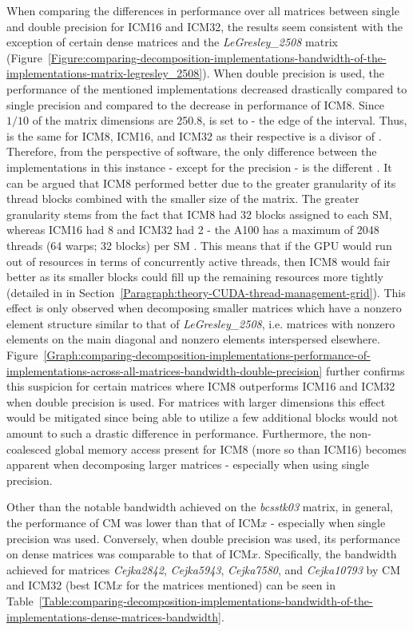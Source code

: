 When comparing the differences in performance over all matrices between single and double precision for ICM16 and ICM32, the results seem consistent with the exception of certain dense matrices and the \textit{LeGresley\_2508} matrix (Figure~\ref{Figure:comparing-decomposition-implementations-bandwidth-of-the-implementations-matrix-legresley_2508}). When double precision is used, the performance of the mentioned implementations decreased drastically compared to single precision and compared to the decrease in performance of ICM8. Since $ 1/10 $ of the matrix dimensions are 250.8,  is set to  - the edge of the interval. Thus,  is the same for ICM8, ICM16, and ICM32 as their respective  is a divisor of . Therefore, from the perspective of software, the only difference between the implementations in this instance - except for the precision - is the different . It can be argued that ICM8 performed better due to the greater granularity of its thread blocks combined with the smaller size of the matrix. The greater granularity stems from the fact that ICM8 had 32 blocks assigned to each SM, whereas ICM16 had 8 and ICM32 had  2 - the A100 has a maximum of 2048 threads (64 warps; 32 blocks) per SM \cite{soj8qSRbfefUdi8Y}. This means that if the GPU would run out of resources in terms of concurrently active threads, then ICM8 would fair better as its smaller blocks could fill up the remaining resources more tightly (detailed in \textit{} in Section~\ref{Paragraph:theory-CUDA-thread-management-grid}). This effect is only observed when decomposing smaller matrices which have a nonzero element structure similar to that of \textit{LeGresley\_2508}, i.e. matrices with nonzero elements on the main diagonal and nonzero elements interspersed elsewhere. Figure~\ref{Graph:comparing-decomposition-implementations-performance-of-implementations-across-all-matrices-bandwidth-double-precision} further confirms this suspicion for certain matrices where ICM8 outperforms ICM16 and ICM32 when double precision is used. For matrices with larger dimensions this effect would be mitigated since being able to utilize a few additional blocks would not amount to such a drastic difference in performance. Furthermore, the non-coalesced global memory access present for ICM8 (more so than ICM16) becomes apparent when decomposing larger matrices - especially when using single precision.
\par Other than the notable bandwidth achieved on the \textit{bcsstk03} matrix, in general, the performance of CM was lower than that of ICM$ x $ - especially when single precision was used. Conversely, when double precision was used, its performance on dense matrices was comparable to that of ICM$ x $. Specifically, the bandwidth achieved for matrices \textit{Cejka2842}, \textit{Cejka5943}, \textit{Cejka7580}, and \textit{Cejka10793} by CM and ICM32 (best ICM$ x $ for the matrices mentioned) can be seen in Table~\ref{Table:comparing-decomposition-implementations-bandwidth-of-the-implementations-dense-matrices-bandwidth}.

